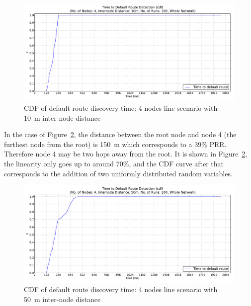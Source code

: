 \begin{figure}[htbp]
  \begin{center}
    \leavevmode
      \includegraphics[scale=0.38]
      {Pics/results/4/MRHOF/line/dist10_montecarlo_cdf_hist.pdf}
   \caption{CDF of default route discovery time: 4 nodes line scenario with 10~m inter-node distance}
    \label{fig:dist10_montecarlo_cdf_hist}
  \end{center}
\end{figure}


In the case of Figure~\ref{fig:dist50_montecarlo_cdf_hist}, the distance between the root node and node 4 (the furthest node from the root) is 150~m which corresponds to a 39\% PRR. Therefore node 4 may be two hops away from the root. It is shown in Figure~\ref{fig:dist50_montecarlo_cdf_hist}, the linearity only goes up to around 70\%, and the CDF curve after that corresponds to the addition of two uniformly distributed random variables.

\begin{figure}[htbp]
  \begin{center}
    \leavevmode
      \includegraphics[scale=0.38]
      {Pics/results/4/MRHOF/line/dist50_montecarlo_cdf_hist.pdf}
   \caption{CDF of default route discovery time: 4 nodes line scenario with 50~m inter-node distance}
    \label{fig:dist50_montecarlo_cdf_hist}
  \end{center}
   \vspace{-20pt}
\end{figure}

